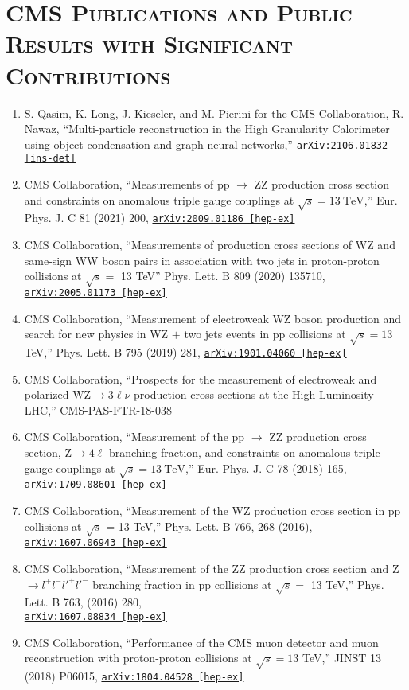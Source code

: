 \documentclass[10pt]{res} %
\begin{document}
\begin{resume}
\begin{itemize}
\end{itemize}

\section{\textsc{CMS Publications and Public Results with Significant Contributions}}
\begin{enumerate}
  \item S. Qasim, K. Long, J. Kieseler, and M. Pierini for the CMS Collaboration, R. Nawaz, ``Multi-particle reconstruction in the High Granularity Calorimeter using object condensation and graph neural networks,'' \href{https://arxiv.org/abs/2106.01832}{\texttt{arXiv:2106.01832 [ins-det]}} 
  \item CMS Collaboration, ``Measurements of pp $\rightarrow$ ZZ production cross section and constraints on anomalous triple gauge couplings at $\sqrt{s} = 13~\mathrm{TeV}$,'' Eur. Phys. J. C 81 (2021) 200, \href{https://arxiv.org/abs/2009.01186}{\texttt{arXiv:2009.01186 [hep-ex]}}
  \item CMS Collaboration, ``Measurements of production cross sections of WZ and same-sign WW boson pairs in association with two jets in proton-proton collisions at $\sqrt{s} =$ 13 TeV'' Phys. Lett. B 809 (2020) 135710, \href{https://arxiv.org/abs/2005.01173}{\texttt{arXiv:2005.01173 [hep-ex]}}
  \item CMS Collaboration, ``Measurement of electroweak WZ boson production and search for new physics in WZ $+$ two jets events in pp collisions at $\sqrt{s}=13$\,TeV,'' Phys. Lett. B 795 (2019) 281, \href{https://arxiv.org/abs/1901.04060} {\texttt{arXiv:1901.04060 [hep-ex]}}
  \item CMS Collaboration, ``Prospects for the measurement of electroweak and polarized $\mathrm{WZ}\to3\ell\nu$ production cross sections at the High-Luminosity LHC,'' CMS-PAS-FTR-18-038
  \item CMS Collaboration, ``Measurement of the pp $\rightarrow$ ZZ production cross section, $\mathrm{Z} \to 4\ell$ branching fraction, and constraints on anomalous triple gauge couplings at $\sqrt{s} = 13~\mathrm{TeV}$,'' Eur. Phys. J. C 78 (2018) 165, \href{https://arxiv.org/abs/1709.08601}{\texttt{arXiv:1709.08601 [hep-ex]}}
  \item CMS Collaboration, ``Measurement of the WZ production cross section in pp collisions at $\sqrt{s}$ = 13 TeV,''
Phys. Lett. B 766, 268 (2016), \href{https://arxiv.org/abs/1607.06943}{\texttt{arXiv:1607.06943 [hep-ex]}}
  \item CMS Collaboration, ``Measurement of the ZZ production cross section and Z $\rightarrow l^{+}l^{-}l'^{+}l'^{-}$ branching fraction in pp collisions at $\sqrt{s} =$ 13 TeV,''
Phys. Lett. B 763, (2016) 280, \\ \href{https://arxiv.org/abs/1607.08834} {\texttt{arXiv:1607.08834 [hep-ex]}}
  \item CMS Collaboration, ``Performance of the CMS muon detector and muon reconstruction with proton-proton collisions at $\sqrt{s} = 13$ TeV,''
JINST 13 (2018) P06015, \href{https://arxiv.org/abs/1804.04528} {\texttt{arXiv:1804.04528 [hep-ex]}}
\end{enumerate}


\end{resume}
\end{document}
